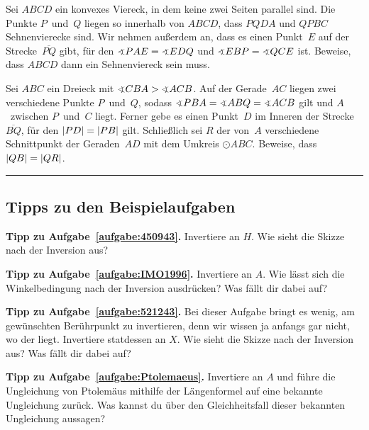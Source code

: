 \begin{aufgabe*}
	Sei $ABCD$ ein konvexes Viereck, in dem keine zwei Seiten parallel sind. Die Punkte $P$~und~$Q$ liegen so innerhalb von $ABCD$, dass $PQDA$ und $QPBC$ Sehnenvierecke sind. Wir nehmen außerdem an, dass es einen Punkt~$E$ auf der Strecke~$\overline{PQ}$ gibt, für den $\winkel PAE=\winkel EDQ$ und $\winkel EBP=\winkel QCE$ ist. Beweise, dass $ABCD$ dann ein Sehnenviereck sein muss.
\end{aufgabe*}

\begin{aufgabe*}[*]
	Sei $ABC$ ein Dreieck mit $\winkel CBA>\winkel ACB$. Auf der Gerade~$AC$ liegen zwei verschiedene Punkte $P$~und~$Q$, sodass $\winkel PBA=\winkel ABQ=\winkel ACB$ gilt und $A$~zwischen $P$~und~$C$ liegt. Ferner gebe es einen Punkt~$D$ im Inneren der Strecke $\overline{BQ}$, für den $\lvert PD\rvert=\lvert PB\rvert$ gilt. Schließlich sei $R$ der von~$A$ verschiedene Schnittpunkt der Geraden~$AD$ mit dem Umkreis $\odot ABC$. Beweise, dass $\lvert QB\rvert=\lvert QR\rvert$. 
\end{aufgabe*}

\vfill\hrule\vspace{-1em}

\subsection*{Tipps zu den Beispielaufgaben}
\textbf{Tipp zu Aufgabe~\ref{aufgabe:450943}.} Invertiere an $H$. Wie sieht die Skizze nach der Inversion aus?

\textbf{Tipp zu Aufgabe~\ref{aufgabe:IMO1996}.} Invertiere an $A$. Wie lässt sich die Winkelbedingung nach der Inversion ausdrücken? Was fällt dir dabei auf?

\textbf{Tipp zu Aufgabe~\ref{aufgabe:521243}.} Bei dieser Aufgabe bringt es wenig, am gewünschten Berührpunkt zu invertieren, denn wir wissen ja anfangs gar nicht, wo der liegt. Invertiere statdessen an $X$. Wie sieht die Skizze nach der Inversion aus? Was fällt dir dabei auf?

\textbf{Tipp zu Aufgabe~\ref{aufgabe:Ptolemaeus}.} Invertiere an $A$ und führe die Ungleichung von Ptolemäus mithilfe der Längenformel auf eine bekannte Ungleichung zurück. Was kannst du über den Gleichheitsfall dieser bekannten Ungleichung aussagen?